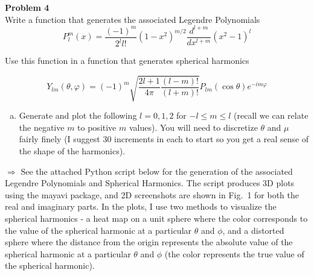 \documentclass[10pt]{article}
\begin{document}
\newpage
\noindent \textbf{Problem 4}\\
Write a function that generates the associated Legendre Polynomials
%
\begin{equation*}
    P_l^m(x) = \frac{(-1)^m}{2^l l!}(1-x^2)^{m/2}\frac{d^{l+m}}{dx^{l+m}}(x^2-1)^l
\end{equation*}

Use this function in a function that generates spherical harmonics

\begin{equation*}
    Y_{lm}(\theta,\varphi)=(-1)^m\sqrt{\frac{2l+1}{4\pi}\frac{(l-m)!}{(l+m)!}}P_{lm}(\cos\theta)e^{-im\varphi}
\end{equation*}

\begin{enumerate}[(a)]
    \item Generate and plot the following $l = 0, 1, 2$ for $−l \leq m \leq l$ (recall we can relate the negative $m$ to positive $m$ values). You will need to discretize $\theta$ and $\mu$ fairly finely (I suggest 30 increments in each to start so you get a real sense of the shape of the harmonics). \\[-5pt]
\end{enumerate}

$\Rightarrow$ See the attached Python script below for the generation of the associated Legendre Polynomials and Spherical Harmonics. The script produces 3D plots using the mayavi package, and 2D screenshots are shown in Fig.~1 for both the real and imaginary parts. In the plots, I use two methods to visualize the spherical harmonics - a heat map on a unit sphere where the color corresponds to the value of the spherical harmonic at a particular $\theta$ and $\phi$, and a distorted sphere where the distance from the origin represents the absolute value of the spherical harmonic at a particular $\theta$ and $\phi$ (the color represents the true value of the spherical harmonic). \\


\end{document}
